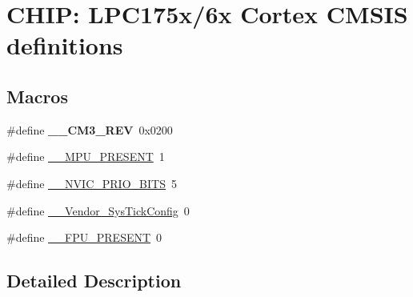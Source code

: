 \hypertarget{group___c_m_s_i_s__175_x__6_x___c_o_m_m_o_n}{\section{C\+H\+I\+P\+: L\+P\+C175x/6x Cortex C\+M\+S\+I\+S definitions}
\label{group___c_m_s_i_s__175_x__6_x___c_o_m_m_o_n}
}
\subsection*{Macros}
\begin{DoxyCompactItemize}
\item 
\hypertarget{group___c_m_s_i_s__175_x__6_x___c_o_m_m_o_n_gac6a3f185c4640e06443c18b3c8d93f53}{\#define {\bfseries \+\_\+\+\_\+\+C\+M3\+\_\+\+R\+E\+V}~0x0200}\label{group___c_m_s_i_s__175_x__6_x___c_o_m_m_o_n_gac6a3f185c4640e06443c18b3c8d93f53}

\item 
\#define \hyperlink{group___c_m_s_i_s__175_x__6_x___c_o_m_m_o_n_ga4127d1b31aaf336fab3d7329d117f448}{\+\_\+\+\_\+\+M\+P\+U\+\_\+\+P\+R\+E\+S\+E\+N\+T}~1
\item 
\#define \hyperlink{group___c_m_s_i_s__175_x__6_x___c_o_m_m_o_n_gae3fe3587d5100c787e02102ce3944460}{\+\_\+\+\_\+\+N\+V\+I\+C\+\_\+\+P\+R\+I\+O\+\_\+\+B\+I\+T\+S}~5
\item 
\#define \hyperlink{group___c_m_s_i_s__175_x__6_x___c_o_m_m_o_n_gab58771b4ec03f9bdddc84770f7c95c68}{\+\_\+\+\_\+\+Vendor\+\_\+\+Sys\+Tick\+Config}~0
\item 
\#define \hyperlink{group___c_m_s_i_s__175_x__6_x___c_o_m_m_o_n_gac1ba8a48ca926bddc88be9bfd7d42641}{\+\_\+\+\_\+\+F\+P\+U\+\_\+\+P\+R\+E\+S\+E\+N\+T}~0
\end{DoxyCompactItemize}


\subsection{Detailed Description}


